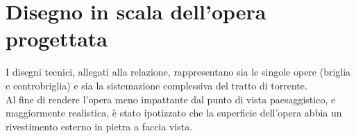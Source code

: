 \section{Disegno in scala dell'opera progettata}
I disegni tecnici, allegati alla relazione, rappresentano sia le singole opere (briglia e controbriglia) e sia la sistemazione complessiva del tratto di torrente.\\
Al fine di rendere l'opera meno impattante dal punto di vista paesaggistico, e maggiormente realistica, è stato ipotizzato che la superficie dell'opera abbia un rivestimento esterno in pietra a faccia vista.  